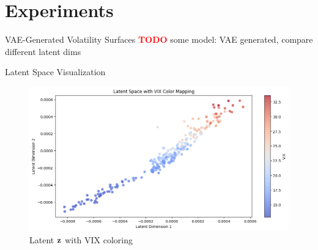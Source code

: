 \documentclass{beamer}
\newcommand\todo{\textcolor{red}{\textbf{TODO}}}
\begin{document}

\section{Experiments}
\begin{frame}{VAE-Generated Volatility Surfaces}
\todo
some model: VAE generated, compare different latent dims
\end{frame}

\begin{frame}{Latent Space Visualization}
\begin{figure}
    \centering
    \includegraphics[width=0.8\linewidth]{docs/slides/img/latent.png}
    \caption{Latent $\bf{z}$ with VIX coloring}
    \label{fig:enter-label}
\end{figure}
\end{frame}
\end{document}
